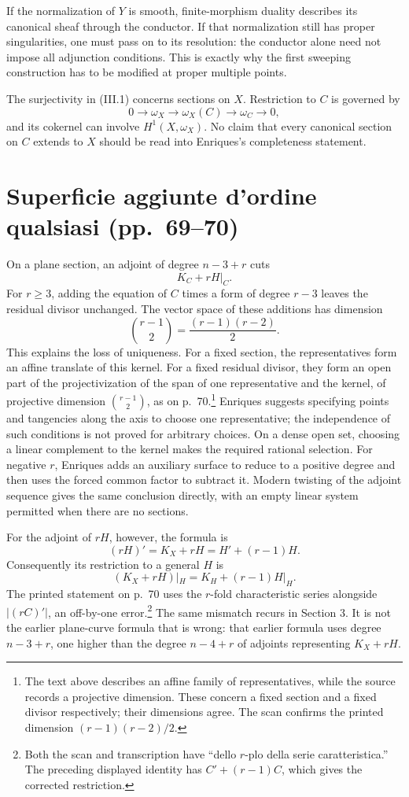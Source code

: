 If the normalization of \(Y\) is smooth, finite-morphism duality describes its canonical sheaf through the conductor. If that normalization still has proper singularities, one must pass on to its resolution: the conductor alone need not impose all adjunction conditions. This is exactly why the first sweeping construction has to be modified at proper multiple points.

The surjectivity in (III.1) concerns sections on \(X\). Restriction to \(C\) is governed by \[
0\to\omega_X\to\omega_X(C)\to\omega_C\to0,
\] and its cokernel can involve \(H^1(X,\omega_X)\). No claim that every canonical section on \(C\) extends to \(X\) should be read into Enriques's completeness statement.

\section[Superficie aggiunte]{Superficie aggiunte d'ordine qualsiasi (pp.~69--70)}\label{commentary-III-2}

On a plane section, an adjoint of degree \(n-3+r\) cuts \[
K_C+rH|_C.
\] For \(r\geq3\), adding the equation of \(C\) times a form of degree \(r-3\) leaves the residual divisor unchanged. The vector space of these additions has dimension \[
\binom{r-1}{2}=\frac{(r-1)(r-2)}2.
\] This explains the loss of uniqueness. For a fixed section, the representatives form an affine translate of this kernel. For a fixed residual divisor, they form an open part of the projectivization of the span of one representative and the kernel, of projective dimension \(\binom{r-1}{2}\), as on p.~70.\footnote{The text above describes an affine family of representatives, while the source records a projective dimension. These concern a fixed section and a fixed divisor respectively; their dimensions agree. The scan confirms the printed dimension \((r-1)(r-2)/2\).} Enriques suggests specifying points and tangencies along the axis to choose one representative; the independence of such conditions is not proved for arbitrary choices. On a dense open set, choosing a linear complement to the kernel makes the required rational selection. For negative \(r\), Enriques adds an auxiliary surface to reduce to a positive degree and then uses the forced common factor to subtract it. Modern twisting of the adjoint sequence gives the same conclusion directly, with an empty linear system permitted when there are no sections.

For the adjoint of \(rH\), however, the formula is \[
(rH)'=K_X+rH=H'+(r-1)H.
\] Consequently its restriction to a general \(H\) is \[
(K_X+rH)|_H=K_H+(r-1)H|_H.
\tag{III.2}
\] The printed statement on p.~70 uses the \(r\)-fold characteristic series alongside \(|(rC)'|\), an off-by-one error.\footnote{Both the scan and transcription have ``dello \(r\)-plo della serie caratteristica.'' The preceding displayed identity has \(C'+(r-1)C\), which gives the corrected restriction.} The same mismatch recurs in Section 3. It is not the earlier plane-curve formula that is wrong: that earlier formula uses degree \(n-3+r\), one higher than the degree \(n-4+r\) of adjoints representing \(K_X+rH\).

